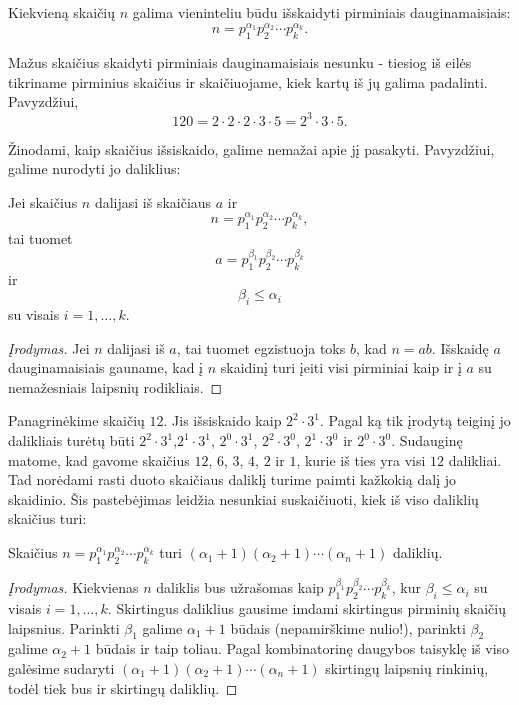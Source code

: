 \begin{teig} 
  Kiekvieną skaičių $n$ galima vieninteliu būdu išskaidyti
  pirminiais dauginamaisiais: $$n=p_1^{\alpha_1}p_2^{\alpha_2}\cdots
  p_k^{\alpha_k}.$$ 
\end{teig}

Mažus skaičius skaidyti pirminiais dauginamaisiais nesunku - tiesiog iš eilės tikriname
pirminius skaičius ir skaičiuojame, kiek kartų iš jų galima padalinti.
Pavyzdžiui, $$120 = 2\cdot 2 \cdot 2 \cdot 3 \cdot 5 = 2^3\cdot 3 \cdot 5.$$

Žinodami, kaip skaičius išsiskaido, galime nemažai apie jį pasakyti.
Pavyzdžiui, galime nurodyti jo daliklius:

\begin{teig} Jei skaičius $n$ dalijasi iš skaičiaus $a$ ir
  $$n=p_1^{\alpha_1}p_2^{\alpha_2}\cdots p_k^{\alpha_k},$$ tai tuomet
  $$a=p_1^{\beta_1}p_2^{\beta_2}\cdots p_k^{\beta_k}$$ ir $$\beta_i \leq
  \alpha_i$$ su visais $i=1,\dots,k$.  
\end{teig}

\begin{proof}[Įrodymas] Jei $n$ dalijasi iš $a$, tai tuomet egzistuoja toks $b$,
  kad $n=ab$. Išskaidę $a$ dauginamaisiais gauname, kad į $n$ skaidinį turi 
  įeiti visi pirminiai kaip ir į $a$ su nemažesniais laipsnių rodikliais.
\end{proof}

Panagrinėkime skaičių $12$. Jis išsiskaido kaip $2^2\cdot 3^1$. Pagal ką
tik įrodytą teiginį jo dalikliais turėtų būti $2^2 \cdot 3^1$,$2^1 \cdot
3^1$, $2^0 \cdot 3^1$, $2^2 \cdot 3^0$, $2^1 \cdot 3^0$ ir $2^0 \cdot 3^0$.
Sudauginę matome, kad gavome skaičius $12$, $6$, $3$, $4$, $2$ ir $1$,
kurie iš ties yra visi $12$ dalikliai. 
Tad norėdami rasti duoto skaičiaus daliklį turime paimti kažkokią dalį jo
skaidinio. Šis pastebėjimas leidžia nesunkiai suskaičiuoti, kiek iš viso
daliklių skaičius turi:

\begin{teig} Skaičius $n = p_1^{\alpha_1}p_2^{\alpha_2}\cdots
  p_k^{\alpha_k}$ turi $(\alpha_1 + 1)(\alpha_2 + 1)\cdots (\alpha_n + 1)$
  daliklių.  
\end{teig}

\begin{proof}[Įrodymas] Kiekvienas $n$ daliklis bus užrašomas kaip
  $p_1^{\beta_1}p_2^{\beta_2}\cdots p_k^{\beta_k}$, kur $\beta_i \leq
  \alpha_i$ su visais $i=1,\dots,k$. Skirtingus daliklius gausime imdami
  skirtingus pirminių skaičių laipsnius. Parinkti $\beta_1$ galime $\alpha_1
  + 1$ būdais (nepamirškime nulio!), parinkti $\beta_2$ galime $\alpha_2 + 1$
  būdais ir taip toliau. Pagal kombinatorinę daugybos taisyklę iš viso
  galėsime sudaryti $(\alpha_1 + 1)(\alpha_2 + 1)\cdots (\alpha_n + 1)$
  skirtingų laipsnių rinkinių, todėl tiek bus ir skirtingų daliklių.
\end{proof}

